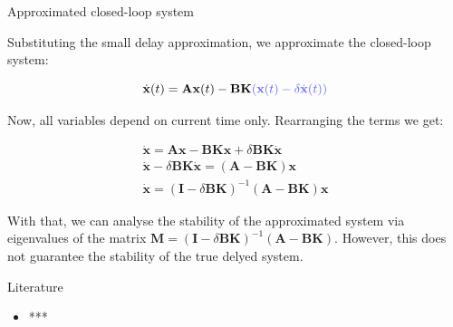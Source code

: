 \documentclass{beamer}
\begin{document}
\begin{frame}{Approximated closed-loop system}
	\begin{flushleft}
		
		Substituting the small delay approximation, we approximate the closed-loop system:
		
		\begin{equation}
			\dot{\mathbf{x}}(t) = \mathbf{A} \mathbf{x}(t) - \mathbf{B} \mathbf{K}  
			\textcolor{myblue}{ \left(\mathbf{x}(t) -\delta \dot{\mathbf{x}}(t) \right)}
		\end{equation}
		
		Now, all variables depend on current time only. Rearranging the terms we get:
		
		\begin{align}
			\dot{\mathbf{x}} = \mathbf{A} \mathbf{x} - 
			\mathbf{B} \mathbf{K}  \mathbf{x} + \delta \mathbf{B} \mathbf{K}   \dot{\mathbf{x}}
		\\
			\dot{\mathbf{x}} - \delta \mathbf{B} \mathbf{K}   \dot{\mathbf{x}} = (\mathbf{A} - \mathbf{B} \mathbf{K})  \mathbf{x}
			\\
			\dot{\mathbf{x}} = 
			(\mathbf{I} - \delta \mathbf{B} \mathbf{K})^{-1} (\mathbf{A} - \mathbf{B} \mathbf{K})  \mathbf{x}
		\end{align}
		
		With that, we can analyse the stability of the approximated system via eigenvalues of the matrix $\mathbf{M}  = (\mathbf{I} - \delta \mathbf{B} \mathbf{K})^{-1} (\mathbf{A} - \mathbf{B} \mathbf{K}) $. However, this does not guarantee the stability of the true delyed system.
		
		
	\end{flushleft}
\end{frame}





\begin{frame}{Literature}

\begin{itemize}
\item ***
\end{itemize}

\end{frame}



\myqrframe
\end{document}

